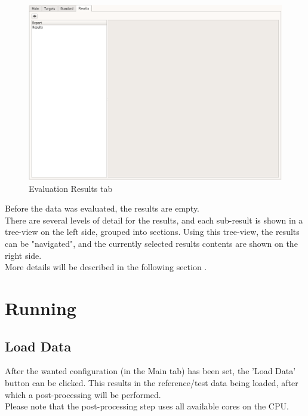 \begin{figure}[H]
  \hspace*{-2cm}
    \includegraphics[width=18cm,frame]{figures/eval_results_empty.png}
  \caption{Evaluation Results tab}
\end{figure}

Before the data was evaluated, the results are empty.\\

There are several levels of detail for the results, and each sub-result is shown in a tree-view on the left side, grouped into sections. Using this tree-view, the results can be "navigated", and the currently selected results contents are shown on the right side. \\

More details will be described in the following section .

\section{Running}
\label{sec:eval_run} 

\subsection{Load Data}
\label{sec:eval_run_load} 

After the wanted configuration (in the Main tab) has been set, the 'Load Data' button can be clicked. This results in the reference/test data being loaded, after which a post-processing will be performed. \\

Please note that the post-processing step uses all available cores on the CPU.

